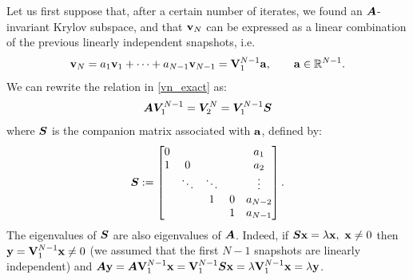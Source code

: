 Let us first suppose that, after a certain number of iterates, we found an $\vb*{A}$-invariant Krylov subspace, and that $\vb{v}_N$ can be expressed as a linear combination of the previous linearly independent snapshots, i.e.
\begin{equation}
    \label{vn_exact}
    \vb{v}_N = a_1 \vb{v}_1 + \dots + a_{N-1} \vb{v}_{N-1} = \vb{V}_1^{N-1}\vb{a}, \qquad \vb{a}\in\mathbb{R}^{N-1}.
\end{equation}
We can rewrite the relation in \eqref{vn_exact} as:
\begin{equation*}
    \vb*{A}\vb*{V}_1^{N-1} = \vb*{V}_2^{N} = \vb*{V}_1^{N-1}\vb*{S}
\end{equation*}
where $\vb*{S}$ is the companion matrix associated with $\vb{a}$, defined by:
\begin{equation}
    \label{S_definition}
    \vb*{S} :=
   \begin{bmatrix}
   0     &        &       &      & a_1 \\
   1     & 0      &       &      & a_2 \\
         & \ddots & \ddots&      & \vdots \\ 
         &        & 1     & 0    & a_{N-2} \\
         &        &       & 1    & a_{N-1} \\
   \end{bmatrix}.
\end{equation}
The eigenvalues of $\vb*{S}$ are also eigenvalues of $\vb*{A}$. Indeed, if $\vb*{S}\vb{x} = \lambda \vb{x}, \,\, \vb{x}\neq 0$ then $\vb{y} = \vb{V}_1^{N-1}\vb{x}\neq 0$ (we assumed that the first $N-1$ snapshots are linearly independent) and $\vb*{A}\vb{y} = \vb*{A}\vb{V}_1^{N-1}\vb{x} = \vb{V}_1^{N-1}\vb*{S}\vb{x} = \lambda \vb{V}_1^{N-1}\vb{x} = \lambda \vb{y}$.

